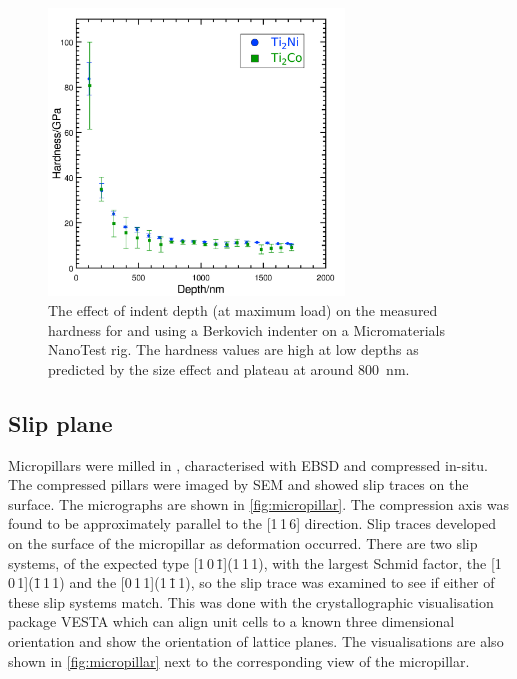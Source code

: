 \begin{figure}[h!tb]
\centering
\includegraphics[width=0.7\textwidth]{Depth_vs_Hardness_Ti2Ni}
\captionsetup{width=0.8\textwidth}
\caption[The size effect on indentation in ]{The effect of indent depth (at maximum load) on the measured hardness for  and  using a Berkovich indenter on a Micromaterials NanoTest rig. The hardness values are high at low depths as predicted by the size effect \cite{Cripps2011} and plateau at around \SI{800}{\nano\meter}.\label{fig:Depth_vs_hardness_Ti2Ni}}
\end{figure}















\subsection{Slip plane}





Micropillars were milled in , characterised with EBSD and compressed in-situ. The compressed pillars were imaged by SEM and showed slip traces on the surface. The micrographs are shown in \autoref{fig:micropillar}. The compression axis was found to be approximately parallel to the [1\,1\,6] direction. Slip traces developed on the surface of the micropillar as deformation occurred. There are two slip systems, of the expected type [1\,0\,\={1}](1\,1\,1), with the largest Schmid factor, the [1\,0\,1](\={1}\,1\,1) and the [0\,1\,1](1\,\={1}\,1), so the slip trace was examined to see if either of these slip systems match. This was done with the crystallographic visualisation package VESTA \cite{Momma2011} which can align unit cells to a known three dimensional orientation and show the orientation of lattice planes. The visualisations are also shown in \autoref{fig:micropillar} next to the corresponding view of the micropillar.





